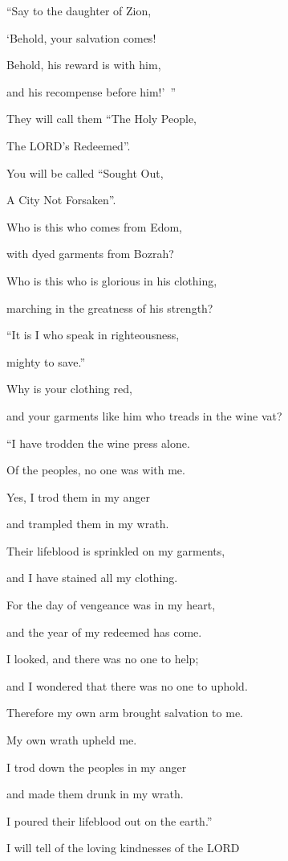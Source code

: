 “Say to the daughter of Zion,

‘Behold, your salvation comes!

Behold, his reward is with him,

and his recompense before him!’ ”

\myverse{}They will call them “The Holy People,

The LORD’s Redeemed”.

You will be called “Sought Out,

A City Not Forsaken”.


\mychapter{} \myverse*{}Who is this who comes from Edom,

\quad\quad with dyed garments from Bozrah?

Who is this who is glorious in his clothing,

marching in the greatness of his strength?

“It is I who speak in righteousness,

mighty to save.”

\myverse{}Why is your clothing red,

and your garments like him who treads in the wine vat?


\vspace{\baselineskip} \myverse{}“I have trodden the wine press alone.

Of the peoples, no one was with me.

Yes, I trod them in my anger

and trampled them in my wrath.

Their lifeblood is sprinkled on my garments,

and I have stained all my clothing.

\myverse{}For the day of vengeance was in my heart,

and the year of my redeemed has come.

\myverse{}I looked, and there was no one to help;

and I wondered that there was no one to uphold.

Therefore my own arm brought salvation to me.

My own wrath upheld me.

\myverse{}I trod down the peoples in my anger

and made them drunk in my wrath.

I poured their lifeblood out on the earth.”


\vspace{\baselineskip} \myverse{}I will tell of the loving kindnesses of the LORD


